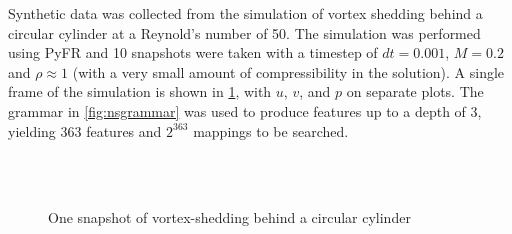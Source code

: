 \documentclass{article}
\begin{document}
Synthetic data was collected from the simulation of vortex shedding behind a circular cylinder at a Reynold's number of 50. The simulation was performed using PyFR \cite{witherden2014pyfr} and 10 snapshots were taken with a timestep of $dt = 0.001$, $M = 0.2$ and $\rho \approx 1$ (with a very small amount of compressibility in the solution). A single frame of the simulation is shown in \cref{fig:ns_data}, with $u$, $v$, and $p$ on separate plots. The grammar in \cref{fig:nsgrammar} was used to produce features up to a depth of 3, yielding 363 features and $2^{363}$ mappings to be searched.

\begin{figure}
  \vskip 0.2in
     \\
     \\
    \caption{One snapshot of vortex-shedding behind a circular cylinder}
    \label{fig:ns_data}
    \vskip -0.2in
\end{figure}
\end{document}
